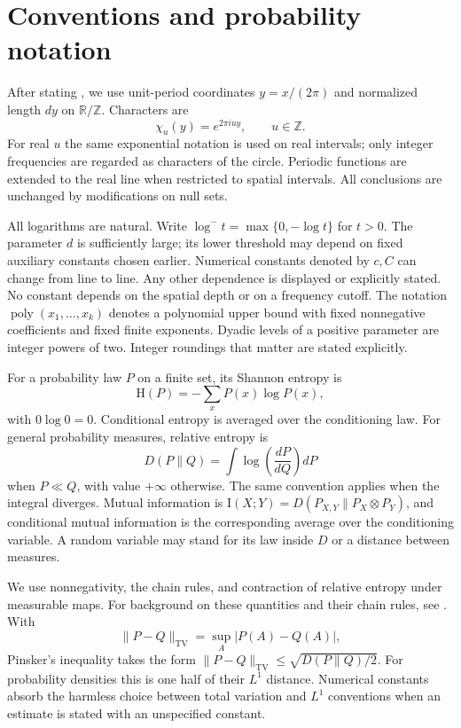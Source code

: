 \section{Conventions and probability notation}\label{sec:preliminaries}

After stating , we use unit-period coordinates
$y=x/(2\pi)$ and normalized length $dy$ on $\mathbb R/\mathbb Z$.
Characters are
\[
 \chi_u(y)=e^{2\pi iuy},\qquad u\in\mathbb Z.
\]
For real $u$ the same exponential notation is used on real intervals;
only integer frequencies are regarded as characters of the circle.
Periodic functions are extended to the real line when restricted to
spatial intervals. All conclusions are unchanged by modifications on
null sets.

All logarithms are natural. Write
$\log^-t=\max\{0,-\log t\}$ for $t>0$. The parameter $d$ is sufficiently
large; its lower threshold may depend on fixed auxiliary constants
chosen earlier. Numerical constants denoted by $c,C$ can change from
line to line. Any other dependence is displayed or explicitly stated.
No constant depends on the spatial depth or on a frequency cutoff.
The notation $\operatorname{poly}(x_1,\ldots,x_k)$ denotes a polynomial
upper bound with fixed nonnegative coefficients and fixed finite
exponents. Dyadic levels of a positive parameter are integer powers
of two. Integer roundings that matter are stated explicitly.

For a probability law $P$ on a finite set, its Shannon entropy is
\[
 \mathrm H(P)=-\sum_x P(x)\log P(x),
\]
with $0\log0=0$. Conditional entropy is averaged over the conditioning
law. For general probability measures, relative entropy is
\[
 D(P\|Q)=\int\log\!\left(\frac{dP}{dQ}\right)dP
\]
when $P\ll Q$, with value $+\infty$ otherwise. The same convention applies
when the integral diverges. Mutual information is
$\mathrm I(X;Y)=D(P_{X,Y}\|P_X\otimes P_Y)$, and conditional mutual
information is the corresponding average over the conditioning
variable. A random variable may stand for its law inside $D$ or a
distance between measures.

We use nonnegativity, the chain rules, and contraction of relative
entropy under measurable maps. For background on these quantities and
their chain rules, see \cite[Chapter~2]{CoverThomas2006}. With
\[
 \|P-Q\|_{\mathrm{TV}}=\sup_A|P(A)-Q(A)|,
\]
Pinsker's inequality takes the form
$\|P-Q\|_{\mathrm{TV}}\le\sqrt{D(P\|Q)/2}$. For probability densities
this is one half of their $L^1$ distance. Numerical constants absorb
the harmless choice between total variation and $L^1$ conventions when
an estimate is stated with an unspecified constant.

